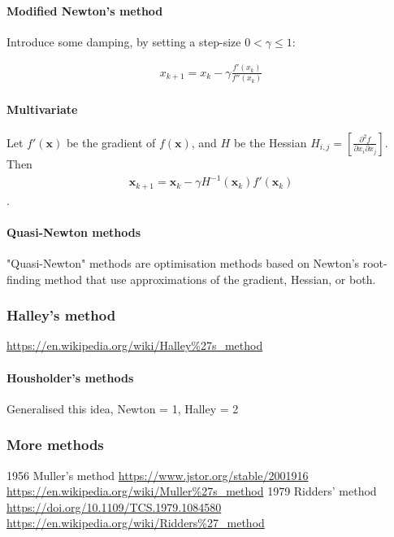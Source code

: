 \documentclass[10pt]{article}
\begin{document}
\paragraph{Modified Newton's method}

Introduce some damping, by setting a step-size $0 < \gamma \leq 1$:

\begin{align}
x_{k+1} = x_k -\gamma \frac{f'(x_k)}{f''(x_k)}
\end{align}

\paragraph{Multivariate}

Let $f'(\bm{x})$ be the gradient of $f(\bm{x})$, and $H$ be the Hessian $H_{i,j} = \left[ \frac{\partial^2 f}{\partial x_i \partial x_j} \right]$.
Then
\begin{align}
\bm{x}_{k+1} = \bm{x}_k -\gamma H^{-1}(\bm{x}_k) f'(\bm{x}_k)
\end{align}
.

\paragraph{Quasi-Newton methods}

"Quasi-Newton" methods are optimisation methods based on Newton's root-finding method that use approximations of the gradient, Hessian, or both.

\subsubsection{Halley's method}

\url{https://en.wikipedia.org/wiki/Halley%27s_method}

\paragraph{Housholder's methods}
Generalised this idea, Newton = 1, Halley = 2

\subsubsection{More methods}

1956 Muller's method \url{https://www.jstor.org/stable/2001916} \url{https://en.wikipedia.org/wiki/Muller%27s_method}
1979 Ridders' method \url{https://doi.org/10.1109/TCS.1979.1084580} \url{https://en.wikipedia.org/wiki/Ridders%27_method}
\end{document}
